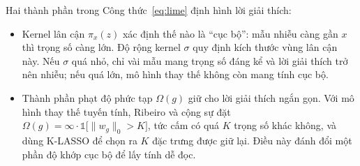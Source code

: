 \documentclass[11pt,a4paper]{article}
\begin{document}
Hai thành phần trong Công thức~\eqref{eq:lime} định hình lời giải thích:
\begin{itemize}
  \item Kernel lân cận $\pi_x(z)$ xác định thế nào là ``cục bộ'': mẫu nhiễu
        càng gần $x$ thì trọng số càng lớn. Độ rộng kernel $\sigma$ quy định
        kích thước vùng lân cận này. Nếu $\sigma$ quá nhỏ, chỉ vài mẫu mang
        trọng số đáng kể và lời giải thích trở nên nhiễu; nếu quá lớn, mô
        hình thay thế không còn mang tính cục bộ.
  \item Thành phần phạt độ phức tạp $\Omega(g)$ giữ cho lời giải thích ngắn
        gọn. Với mô hình thay thế tuyến tính, Ribeiro và cộng sự đặt
        $\Omega(g) = \infty \cdot \mathbb{1}\big[\lVert w_g \rVert_0 > K\big]$,
        tức cấm có quá $K$ trọng số khác không, và dùng K-LASSO để chọn ra
        $K$ đặc trưng được giữ lại. Điều này đánh đổi một phần độ khớp cục bộ
        để lấy tính dễ đọc.
\end{itemize}
\end{document}

